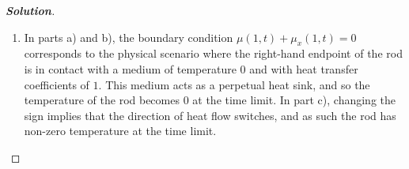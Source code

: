 \documentclass[letterpaper,11pt]{article} %
\theoremstyle{plain}
\begin{document}
\begin{proof}[\textbf{Solution}]
\begin{enumerate}[label=\alph*.)]
        The complete solution is therefore
        \begin{equation*}
        \boxed{\mu(x, t) = \frac{225}{2}x + \sum_{n=1}^\infty \left(\frac{\displaystyle 75\left(\cos\left(\sqrt{\lambda_n} \right)- 1\right)}{\displaystyle \frac{\sqrt{\lambda_n}}{2} - \frac{1}{4}\sin\left(2\sqrt{\lambda_n}\right)} \right)\sin\left(\sqrt{\lambda_n}x\right) e^{-\lambda_n t}}.
        \end{equation*}
        where the eigenvalues $\lambda_n$ satisfy the transcendental equation $\tan\left(\sqrt{\lambda_n}\right) = \sqrt{\lambda_n}$. Computing the limit as $t\to \infty$ produces
         \begin{align*}
        \lim\limits_{t \to \infty} \mu(x, t) &=  \lim\limits_{t \to \infty}\left(\frac{225}{2}x + \sum_{n=1}^\infty c_n \sin(\sqrt{\lambda_n}x) e^{-\lambda_n t}\right) = \lim\limits_{t \to \infty}\frac{225}{2}x + \lim\limits_{t \to \infty}\sum_{n=1}^\infty c_n \sin(\sqrt{\lambda_n}x) e^{-\lambda_n t} \\
         &= \frac{225}{2}x + \lim\limits_{t \to \infty}\sum_{n=1}^\infty c_n \sin(\sqrt{\lambda_n}x) e^{-\lambda_n t}
         \geq \frac{225}{2}x + \sum_{n=1}^\infty \lim\limits_{t \to \infty} c_n \sin(\sqrt{\lambda_n}x) e^{-\lambda_n t}\\
         &= \frac{225}{2}x + \sum_{n=1}^\infty 0 = \boxed{\frac{225}{2}x}.
        \end{align*}
        
        \item In parts a) and b), the boundary condition $\mu(1,t) + \mu_x(1,t)=0$ corresponds to the physical scenario where the right-hand endpoint of the rod is in contact with a medium of temperature $0$ and with heat transfer coefficients of $1$. This medium acts as a perpetual heat sink, and so the temperature of the rod  becomes $0$ at the time limit. In part c), changing the sign implies that the direction of heat flow switches, and as such the rod has non-zero temperature at the time limit.
        
    \end{enumerate}
\end{proof}
\end{document}

